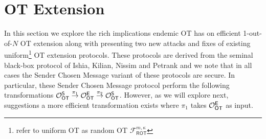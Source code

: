 

\newcommand{\rr}{\ensuremath{\boldsymbol{r}}}
\renewcommand{\tt}{\ensuremath{\boldsymbol{t}}}
\newcommand{\ww}{\ensuremath{\boldsymbol{w}}}
\newcommand{\cc}{\ensuremath{\boldsymbol{c}}}
\newcommand{\uu}{\ensuremath{\boldsymbol{u}}}
\newcommand{\qq}{\ensuremath{\boldsymbol{q}}}
\newcommand{\bb}{\ensuremath{\boldsymbol{b}}}
\newcommand{\vv}{\ensuremath{\boldsymbol{v}}}
\newcommand{\nc}{\ensuremath{{n_\mathcal{C}}}}
\newcommand{\kc}{\ensuremath{{k_\mathcal{C}}}}
\newcommand{\dc}{\ensuremath{{d_\mathcal{C}}}}

\section{OT Extension}


In this section we explore the rich implications endemic OT has on efficient 1-out-of-$N$ OT extension along with presenting two new attacks and fixes of existing uniform\footnote{\cite{KOS15, OOS16} refer to uniform OT as random OT $\mathcal{F}^{m,\kappa}_{\textsf{ROT}}$} OT extension protocols\cite{KOS15, OOS16}. These protocols are derived from the seminal black-box protocol of Ishia, Kilian, Nissim and Petrank\cite{IKNP03} and we note that in all cases the Sender Chosen Message variant of these protocols\cite{IKNP03, KOS15, OOS16} are secure. In particular, these Sender Chosen Message protocol perform the following transformations $\mathcal{O}_{\mathsf{OT}}^\mathsf{S}\overset{\pi_1}{\rightarrow} \mathcal{O}_{\mathsf{OT}}^\mathsf{E} \overset{\pi_2}{\rightarrow} \mathcal{O}_{\mathsf{OT}}^\mathsf{S}$. However, as we will explore next,  suggestions a more efficient transformation exists where $\pi_1$ takes $\mathcal{O}_{\mathsf{OT}}^\mathsf{E}$ as input.






